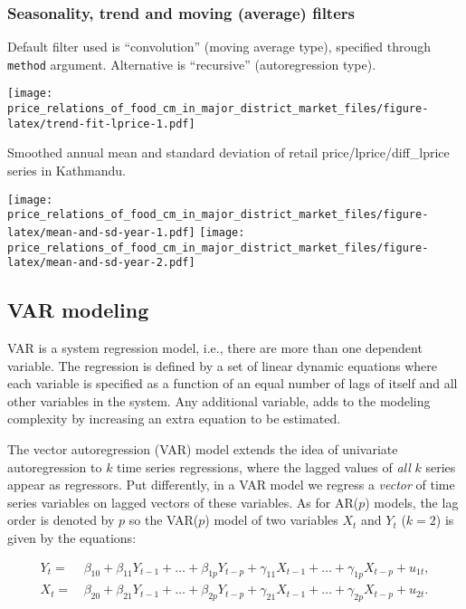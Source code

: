 \documentclass[12pt,]{article}
\begin{document}
\hypertarget{seasonality-trend-and-moving-average-filters}{%
\subsubsection{Seasonality, trend and moving (average) filters}\label{seasonality-trend-and-moving-average-filters}}

Default filter used is ``convolution'' (moving average type), specified through \texttt{method} argument. Alternative is ``recursive'' (autoregression type).

\texttt{[image: price\_relations\_of\_food\_cm\_in\_major\_district\_market\_files/figure-latex/trend-fit-lprice-1.pdf]}

Smoothed annual mean and standard deviation of retail price/lprice/diff\_lprice series in Kathmandu.

\texttt{[image: price\_relations\_of\_food\_cm\_in\_major\_district\_market\_files/figure-latex/mean-and-sd-year-1.pdf]} \texttt{[image: price\_relations\_of\_food\_cm\_in\_major\_district\_market\_files/figure-latex/mean-and-sd-year-2.pdf]}

\hypertarget{var-modeling}{%
\subsection{VAR modeling}\label{var-modeling}}

VAR is a system regression model, i.e., there are more than one dependent variable. The regression is defined by a set of linear dynamic equations where each variable is specified as a function of an equal number of lags of itself and all other variables in the system. Any additional variable, adds to the modeling complexity by increasing an extra equation to be estimated.

The vector autoregression (VAR) model extends the idea of univariate autoregression to \(k\) time series regressions, where the lagged values of \emph{all} \(k\) series appear as regressors. Put differently, in a VAR model we regress a \emph{vector} of time series variables on lagged vectors of these variables. As for AR(\(p\)) models, the lag order is denoted by \(p\) so the VAR(\(p\)) model of two variables \(X_t\) and \(Y_t\) (\(k=2\)) is given by the equations:

\[
\begin{aligned}
  Y_t =& \, \beta_{10} + \beta_{11} Y_{t-1} + \dots + \beta_{1p} Y_{t-p} + \gamma_{11} X_{t-1} + \dots + \gamma_{1p} X_{t-p} + u_{1t}, \\
  X_t =& \, \beta_{20} + \beta_{21} Y_{t-1} + \dots + \beta_{2p} Y_{t-p} + \gamma_{21} X_{t-1} + \dots + \gamma_{2p} X_{t-p} + u_{2t}.
\end{aligned}
\]
\end{document}
